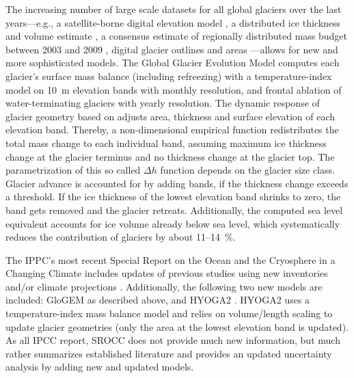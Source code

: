     The increasing number of large scale datasets for all global glaciers over the last years---e.g., a satellite-borne digital elevation model \citep{Jarvis2008}, a distributed ice thickness and volume estimate \citep{Huss2012}, a consensus estimate of regionally distributed mass budget between 2003 and 2009 \citep{Gardner2013}, digital glacier outlines and areas \citep[RGI v4.0,][]{Pfeffer2014}---allows for new and more sophisticated models. The Global Glacier Evolution Model \citep[GloGEM,][]{Huss2015} computes each glacier's surface mass balance (including refreezing) with a temperature-index model on \SI{10}{\meter} elevation bands with monthly resolution, and frontal ablation of water-terminating glaciers with yearly resolution. The dynamic response of glacier geometry based on \citet{Huss2010} adjusts area, thickness and surface elevation of each elevation band. Thereby, a non-dimensional empirical function redistributes the total mass change to each individual band, assuming maximum ice thickness change at the glacier terminus and no thickness change at the glacier top. The parametrization of this so called $\Delta h$ function depends on the glacier size class. Glacier advance is accounted for by adding bands, if the thickness change exceeds a threshold. If the ice thickness of the lowest elevation band shrinks to zero, the band gets removed and the glacier retreats. Additionally, the computed sea level equivalent accounts for ice volume already below sea level, which systematically reduces the contribution of glaciers by about 11--\SI{14}{\percent}.

    The IPPC's most recent Special Report on the Ocean and the Cryosphere in a Changing Climate \citep[SROCC][]{IPCC2019_TS} includes updates of previous studies using new inventories and/or climate projections \citep{Bliss2014,Slangen2017,Hock2019a}. Additionally, the following two new models are included: GloGEM as described above, and HYOGA2 \citet{Hirabayashi2013}. HYOGA2 uses a temperature-index mass balance model and relies on volume/length scaling to update glacier geometries (only the area at the lowest elevation band is updated). As all IPCC report, SROCC does not provide much new information, but much rather summarizes established literature and provides an updated uncertainty analysis by adding new and updated models.

